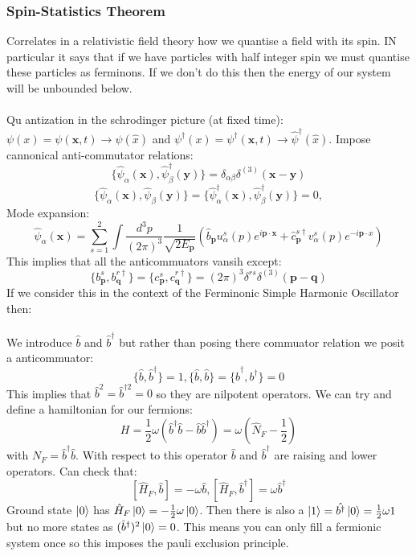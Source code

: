\documentclass[12pt, a4paper, twoside, titlepage]{article}
\begin{document}
\begin{pmartix}
\subsubsection{Spin-Statistics Theorem}
Correlates in a relativistic field theory how we quantise a field with its spin. IN particular it says that if we have particles with half integer spin we must quantise these particles as ferminons. If we don't do this then the energy of our system will be unbounded below. \\\\
Qu
antization in the schrodinger picture (at fixed time): $\psi(x) = \psi(\bm x, t) \rightarrow \psi(\hat x)$ and $\psi^{\dagger}(x) = \psi^{\dagger}(\bm x, t) \rightarrow \hat \psi^{\dagger}(\hat x)$. Impose cannonical anti-commutator relations:
$$
\{ \hat \psi_{\alpha}(\bm x) , \hat \psi_{\beta}^{\dagger}(\bm y) \} = \delta_{\alpha \beta} \delta^{(3)}(\bm x- \bm y)
$$
$$
\{\hat \psi_{\alpha}(\bm x), \hat \psi_{\beta}(\bm y) \} = \{\hat \psi^{\dagger}_{\alpha}(\bm x), \hat \psi^{\dagger}_{\beta}(\bm y) \} = 0,
$$
Mode expansion:
$$
\hat \psi_{\alpha}(\bm x) = \sum_{s=1}^2 \int \frac{d^3p}{(2 \pi)^3} \frac{1}{\sqrt{2 E_{\bm p}}} (\hat b_{\bm p} u^s_{\alpha} (p) e^{i \bm p \cdot \bm x} + \hat c^{s \dagger}_{\bm p} v^s_{\alpha}(p) e^{- i \bm p \cdot x})
$$
This implies that all the anticommuators vansih except:
$$
\{ b^s_{\bm p}, b^{r \dagger}_{\bm q} \} = \{ c^s_{\bm p}, c^{r \dagger}_{\bm q} \} = (2 \pi)^3 \delta^{rs} \delta^{(3)}(\bm p - \bm q)
$$
If we consider this in the context of the Ferminonic Simple Harmonic Oscillator then:\\\\
We introduce $\hat b$ and $\hat b^{\dagger}$ but rather than posing there commuator relation we posit a anticommuator:
$$
\{\hat b, \hat b^{\dagger} \} = 1, \{ \hat b, \hat b\} = \{ \hat b^{\dagger}, b^{\dagger} \} = 0
$$
This implies that $\hat b^2 = \hat b^{\dagger 2} = 0$ so they are nilpotent operators. We can try and define a hamiltonian for our fermions:
$$
H = \frac{1}{2} \omega (\hat b^{\dagger} \hat b - \hat b \hat b^{\dagger} ) = \omega( \hat N_F - \frac{1}{2}) 
$$
with $N_F =  \hat b^{\dagger} \hat b$. With respect to this operator $\hat b$ and $\hat b^{\dagger}$ are raising and lower operators. Can check that:
$$
[\hat H_F, \hat b] = - \omega \hat b, [\hat H_F, \hat b^{\dagger}] = \omega \hat b^{\dagger}
$$
Ground state $\ket{0}$ has $\hat H_F \ket{0} = -\frac{1}{2} \omega \ket{0}$. Then there is also  a $\ket{1} = \hat{b^{\dagger}} \ket{0} = \frac{1}{2} \omega{1}$ but no more states as $(\hat b^{\dagger})^2 \ket{0} = 0$. This means you can only fill a fermionic system once so this imposes the pauli exclusion principle.\\\\

\end{pmartix}
\end{document}
